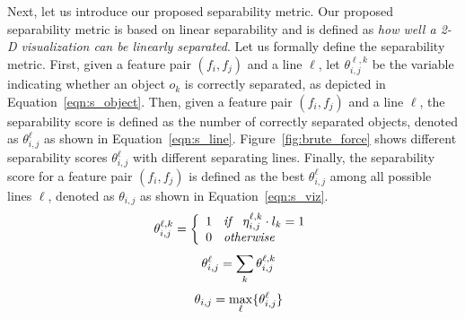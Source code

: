 \vspace{2mm} %
Next, let us introduce our proposed separability metric. Our proposed separability metric is based on linear separability and is defined as {\em how well a 2-D visualization can be linearly separated}. Let us formally define the separability metric.
First, given a feature pair $(f_i, f_j)$ and a line $\ell$, let $\theta_{i,j}^{\ell,k}$ be the variable indicating whether an object $o_k$ is correctly separated, as depicted in Equation~\ref{eqn:s_object}.
Then, given a feature pair $(f_i, f_j)$ and a line $\ell$, the separability score is defined as the number of correctly separated objects, denoted as $\theta_{i, j}^\ell$ as shown in Equation~\ref{eqn:s_line}. Figure~\ref{fig:brute_force} shows different separability scores $\theta_{i, j}^\ell$ with different separating lines. Finally, the separability score for a feature pair $(f_i,f_j)$ is defined as the best $\theta_{i, j}^{\ell}$ among all possible lines $\ell$, denoted as $\theta_{i, j}$ as shown in Equation~\ref{eqn:s_viz}. 
\begin{equation}\label{eqn:s_object}
\theta_{i,j}^{\ell,k}=\left\{
                \begin{array}{ll}
                  1 \textit{\hspace{2mm} if \hspace{2mm}} \eta_{i,j}^{\ell,k}\cdot l_k = 1\\
                  0 \textit{\hspace{2mm} otherwise \hspace{2mm}} 
                \end{array}
              \right.
\end{equation}
\begin{equation}\label{eqn:s_line} 
\hspace{3mm} \theta_{i,j}^{\ell}= \sum_{k}{\theta_{i,j}^{\ell,k}} %
\end{equation}
\begin{equation}\label{eqn:s_viz}
\hspace{3mm} \theta_{i,j}= \max_{\ell}\{\theta_{i,j}^{\ell}\} %
\end{equation}

